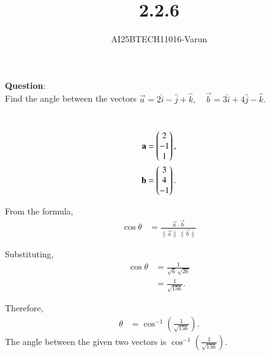 \documentclass[journal]{IEEEtran}
\begin{document}

\vspace{3cm}

\title{2.2.6}
\author{AI25BTECH11016-Varun}
 \maketitle
{\let\newpage\relax\maketitle}
\renewcommand{\thefigure}{\theenumi}
\renewcommand{\thetable}{\theenumi}
\setlength{\intextsep}{10pt} %

\renewcommand{\thetable}{\theenumi}
\textbf{Question}:\\

  Find the angle between the vectors 
$\vec{a} = 2\hat{i} - \hat{j} + \hat{k}, \quad \vec{b} = 3\hat{i} + 4\hat{j} - \hat{k}.$

\solution \\

\begin{align}
\mathbf{a} &= \begin{pmatrix}2 \\ -1 \\ 1\end{pmatrix}, \\
\mathbf{b} &= \begin{pmatrix}3 \\ 4 \\ -1\end{pmatrix}.
\end{align}

From the formula,
\begin{align}
\cos \theta &= \frac{\vec{a} \cdot \vec{b}}{\lVert \vec{a} \rVert \, \lVert \vec{b} \rVert}
\end{align}

Substituting,
\begin{align}
\cos \theta &= \frac{1}{\sqrt{6}\,\sqrt{26}} \\
&= \frac{1}{\sqrt{156}}. \nonumber
\end{align}

Therefore,
\begin{align}
\theta &= \cos^{-1}\left(\frac{1}{\sqrt{156}}\right).
\end{align}
The angle between the given two vectors is $\cos^{-1}\left(\frac{1}{\sqrt{156}}\right).$
\end{document}
